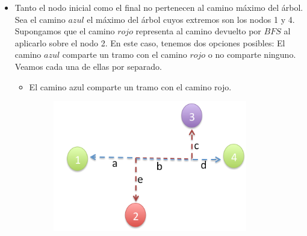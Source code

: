 \begin{itemize}
\begin {itemize}
A partir del gráfico anterior, supongamos que el camino rojo representa al máximo que resulta del algoritmo $BFS$ luego de haberlo aplicado sobre el nodo 2. \newline
Por otro lado, supongamos que dicho algoritmo retorna al nodo 3 como el más lejano del 2. Como el nodo 3 se encuentra más lejos del 2 que el 1, $b \geq a$. 
\begin{itemize}
\item $a$ = $b$: En este caso, ambos caminos hubieran sido correctos ya que dist(4,1) sería igual a dist(4,3). 
\item $a<b$: Si este caso sucediera, $b$ debería formar parte del camino máximo del árbol. Esto se debe a que el camino más largo del árbol debe estar conformado por los caminos $c$-$d$ y el máximo entre $a$ y $b$. Por lo tanto, si $b>a$, el camino azul no sería el máximo. Luego, es absurdo suponer que el extremo del camino máximo retornado por $BFS$ no pertencía al camino máximo del árbol.\newline
\end{itemize}
\item Tanto el nodo inicial como el final no pertenecen al camino máximo del árbol. \newline \newline
Sea el camino $azul$ el máximo del árbol cuyos extremos son los nodos 1 y 4. Supongamos que el camino $rojo$ representa al camino devuelto por $BFS$ al aplicarlo sobre el nodo 2. En este caso, tenemos dos opciones posibles: El camino $azul$ comparte un tramo con el camino $rojo$ o no comparte ninguno. Veamos cada una de ellas por separado. \newline
\begin{itemize}
\item El camino azul comparte un tramo con el camino rojo. \newline
\begin{figure}[H] %
\begin{minipage}[H]{240pt}
\includegraphics[width=240pt]{../imgs/ej2casos01.jpg}

\end{minipage}
\end{figure}
\end{itemize}
\end{itemize}
\end{itemize}
